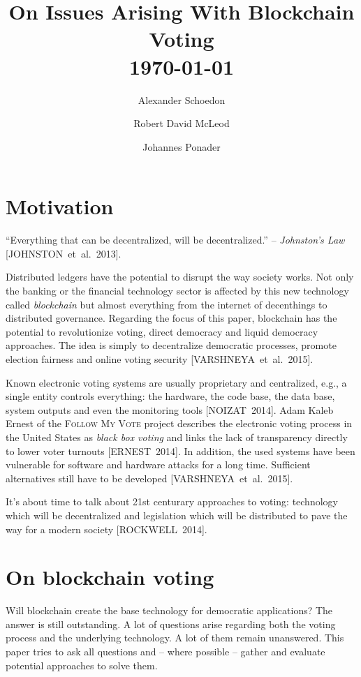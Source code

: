 \documentclass[9pt,oneside]{amsart}
\title{On Issues Arising With Blockchain Voting \\ {\smaller \today}}
\author{
    Alexander Schoedon
}
\author{
    Robert David McLeod
}
\author{
    Johannes Ponader
}
\begin{document}
\pagecolor{lightblue}

\begin{abstract}
\end{abstract}

\maketitle

\setlength{\columnsep}{20pt}
\begin{multicols}{2}

\section{Motivation}\label{sec:motivation}
\enquote{Everything that can be decentralized, will be decentralized.} -- \textit{Johnston's Law} [JOHNSTON~et~al.~2013].\par
Distributed ledgers have the potential to disrupt the way society works. Not only the banking or the financial technology sector is affected by this new technology called \textit{blockchain} but almost everything from the internet of decenthings to distributed governance. Regarding the focus of this paper, blockchain has the potential to revolutionize voting, direct democracy and liquid democracy approaches. The idea is simply to decentralize democratic processes, promote election fairness and online voting security [VARSHNEYA~et~al.~2015].\par
Known electronic voting systems are usually proprietary and centralized, e.g., a single entity controls everything: the hardware, the code base, the data base, system outputs and even the monitoring tools [NOIZAT~2014]. Adam Kaleb Ernest of the \textsc{Follow My Vote} project describes the electronic voting process in the United States as \textit{black box voting} and links the lack of transparency directly to lower voter turnouts [ERNEST~2014]. In addition, the used systems have been vulnerable for software and hardware attacks for a long time. Sufficient alternatives still have to be developed [VARSHNEYA~et~al.~2015].\par
It's about time to talk about 21st centurary approaches to voting: technology which will be decentralized and legislation which will be distributed to pave the way for a modern society [ROCKWELL~2014].

\section{On blockchain voting}
Will blockchain create the base technology for democratic applications? The answer is still outstanding. A lot of questions arise regarding both the voting process and the underlying technology. A lot of them remain unanswered. This paper tries to ask all questions and -- where possible -- gather and evaluate potential approaches to solve them.


\end{multicols}
\end{document}
